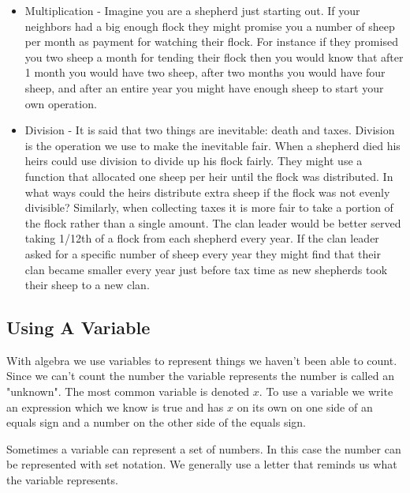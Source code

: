 \begin{itemize}
    \item Multiplication - Imagine you are a shepherd just starting out. If your neighbors had a big enough flock they might promise you a number of sheep per month as payment for watching their flock. For instance if they promised you two sheep a month for tending their flock then you would know that after 1 month you would have two sheep, after two months you would have four sheep, and after an entire year you might have enough sheep to start your own operation.
\end{itemize}

\begin{itemize}
    \item Division - It is said that two things are inevitable: death and taxes. Division is the operation we use to make the inevitable fair. When a shepherd died his heirs could use division to divide up his flock fairly. They might use a function that allocated one sheep per heir until the flock was distributed. In what ways could the heirs distribute extra sheep if the flock was not evenly divisible? Similarly, when collecting taxes it is more fair to take a portion of the flock rather than a single amount. The clan leader would be better served taking 1/12th of a flock from each shepherd every year. If the clan leader asked for a specific number of sheep every year they might find that their clan became smaller every year just before tax time as new shepherds took their sheep to a new clan.
\end{itemize}


\subsection{Using A Variable}
\label{sss:usin-fde2}




With algebra we use variables to represent things we haven't been able to count. Since we
can't count the number the variable represents the number is called an "unknown". The most
common variable is denoted $x$. To use a variable we write an expression which we know is
true and has $x$ on its own on one side of an equals sign and a number on the other side
of the equals sign.



Sometimes a variable can represent a set of numbers. In this case the number can be
represented with set notation. We generally use a letter that reminds us what the variable
represents.



